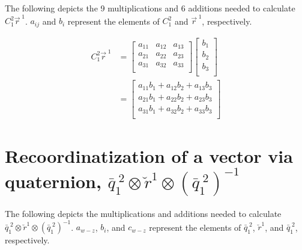 \begin{parts}
    \solution
    The following depicts the 9 multiplications and 6 additions needed to calculate $C_1^2\vec{r}^{\;1}$. $a_{ij}$ and $b_i$ represent the elements of $C_1^2$ and $\vec{r}^{\;1}$, respectively.

    \begin{equation*}
        \begin{split}
            C_1^2\vec{r}^{\;1} & =
            \begin{bmatrix}
                a_{11} & a_{12} & a_{13} \\
                a_{21} & a_{22} & a_{23} \\
                a_{31} & a_{32} & a_{33} \\
            \end{bmatrix}
            \begin{bmatrix}
                b_1 \\
                b_2 \\
                b_3 \\
            \end{bmatrix} \\
            & =
            \begin{bmatrix}
                a_{11}b_1 + a_{12}b_2 + a_{13}b_3 \\
                a_{21}b_1 + a_{22}b_2 + a_{23}b_3 \\
                a_{31}b_1 + a_{32}b_2 + a_{33}b_3 \\
            \end{bmatrix}
        \end{split}
    \end{equation*}

    \part{Recoordinatization of a vector via quaternion, $\bar{q}_1^{\;2} \otimes \breve{r}^1 \otimes \left(\bar{q}_1^{\;2}\right)^{-1}$}

    The following depicts the  multiplications and  additions needed to calculate $\bar{q}_1^{\;2} \otimes \breve{r}^1 \otimes \left(\bar{q}_1^{\;2}\right)^{-1}$. $a_{w-z}$, $b_i$, and $c_{w-z}$ represent the elements of $\bar{q}_1^{\;2}$, $\breve{r}^1$, and $\bar{q}_1^{\;2}$, respectively.


\end{parts}
